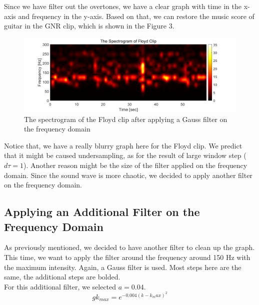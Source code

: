 \documentclass{article}
\begin{document}
Since we have filter out the overtones, we have a clear graph with time in the x-axis and frequency in the y-axis. Based on that, we can restore the music score of guitar in the GNR clip, which is shown in the Figure 3.\\
\begin{figure}[h]
    \centerline{\includegraphics[width=6in]{music_score_Floyd_1.png}}
    \caption{The spectrogram of the Floyd clip after applying a Gauss filter on the frequency domain}
\end{figure}
\newpage
Notice that, we have a really blurry graph here for the Floyd clip. We predict that it might be caused undersampling, as for the result of large window step ($d\tau=1$). Another reason might be the size of the filter applied on the frequency domain. Since the sound wave is more chaotic, we decided to apply another filter on the frequency domain.

\subsection{Applying an Additional Filter on the Frequency Domain}
As previously mentioned, we decided to have another filter to clean up the graph. This time, we want to apply the filter around the frequency around 150 Hz with the maximum intensity. Again, a Gauss filter is used. Most steps here are the same, the additional steps are bolded.
~\\
For this additional filter, we selected $a=0.04$. 
\begin{equation}
    gk_{max} = e^{-0.004(k-k_max)^2}
\end{equation}
\end{document}
